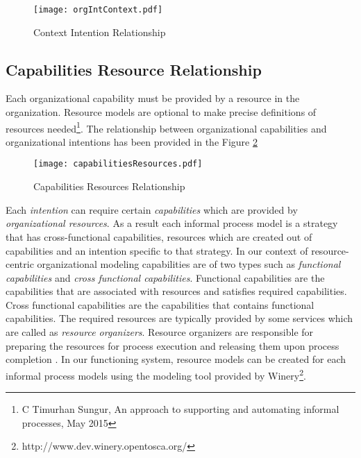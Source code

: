 \begin{figure}
	\centering
	\texttt{[image: orgIntContext.pdf]}
	\caption{Context Intention Relationship}
	\label{fig:orgIntentions}
\end{figure}

\subsection{Capabilities Resource Relationship}
\label{sec:capIntRel}
Each organizational capability must be provided by a resource in the organization. Resource models are optional to make precise definitions of resources needed\footnote{C Timurhan Sungur, An approach to supporting and automating informal processes, May 2015}. The relationship between organizational capabilities and organizational intentions has been provided in the Figure \ref{fig:capabilitiesresources}
 
\begin{figure}
	\centering
	\texttt{[image: capabilitiesResources.pdf]}
	\caption{Capabilities Resources Relationship}
	\label{fig:capabilitiesresources}
\end{figure}

Each \textit{intention} can require certain \textit{capabilities} which are provided by \textit{organizational resources}. 
As a result each informal process model is a strategy that has cross-functional capabilities, resources which are created out of capabilities and an intention specific to that strategy. In our context of resource-centric organizational modeling capabilities are of two types such as \textit{functional capabilities} and \textit{cross functional capabilities}. Functional capabilities are the capabilities that are associated with resources and satisfies required capabilities. Cross functional capabilities are the capabilities that contains functional capabilities. The required resources are typically provided by some services which are called as \textit{resource organizers}. Resource organizers are responsible for preparing the resources for process execution and releasing them upon process completion \cite{Sungur2014a}. In our functioning system, resource models can be created for each informal process models using the modeling tool provided by Winery\footnote{http://www.dev.winery.opentosca.org/}. 


